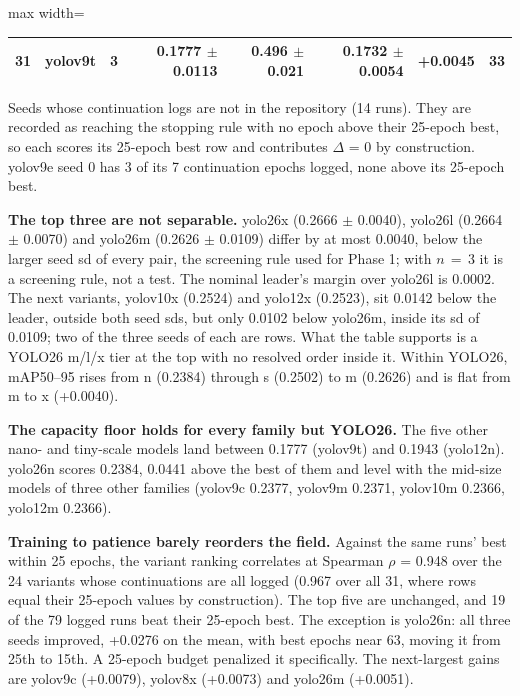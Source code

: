 \documentclass[10pt]{article}
\begin{document}
\begin{table}[htbp]
\begin{adjustbox}{max width=\linewidth}
\begin{tabular}{rllrrrrr}
31 & yolov9t & 3 & 0.1777 $\pm$ 0.0113 & 0.496 $\pm$ 0.021 & 0.1732 $\pm$ 0.0054 & +0.0045 & 33 \\
\bottomrule
\end{tabular}
\end{adjustbox}
\par\smallskip\raggedright\footnotesize \textdagger{} Seeds whose continuation logs are not in the repository (14 runs). They are recorded as reaching the stopping rule with no epoch above their 25-epoch best, so each scores its 25-epoch best row and contributes $\Delta$ = 0 by construction. yolov9e seed 0 has 3 of its 7 continuation epochs logged, none above its 25-epoch best.
\end{table}
\textbf{The top three are not separable.} yolo26x (0.2666 $\pm$ 0.0040), yolo26l (0.2664 $\pm$ 0.0070) and yolo26m (0.2626 $\pm$ 0.0109) differ by at most 0.0040, below the larger seed sd of every pair, the screening rule used for Phase 1; with $n\,{=}\,3$ it is a screening rule, not a test. The nominal leader's margin over yolo26l is 0.0002. The next variants, yolov10x (0.2524) and yolo12x (0.2523), sit 0.0142 below the leader, outside both seed sds, but only 0.0102 below yolo26m, inside its sd of 0.0109; two of the three seeds of each are \textdagger{} rows. What the table supports is a YOLO26 m/l/x tier at the top with no resolved order inside it. Within YOLO26, mAP50--95 rises from n (0.2384) through s (0.2502) to m (0.2626) and is flat from m to x (+0.0040).

\textbf{The capacity floor holds for every family but YOLO26.} The five other nano- and tiny-scale models land between 0.1777 (yolov9t) and 0.1943 (yolo12n). yolo26n scores 0.2384, 0.0441 above the best of them and level with the mid-size models of three other families (yolov9c 0.2377, yolov9m 0.2371, yolov10m 0.2366, yolo12m 0.2366).

\textbf{Training to patience barely reorders the field.} Against the same runs' best within 25 epochs, the variant ranking correlates at Spearman $\rho$ = 0.948 over the 24 variants whose continuations are all logged (0.967 over all 31, where \textdagger{} rows equal their 25-epoch values by construction). The top five are unchanged, and 19 of the 79 logged runs beat their 25-epoch best. The exception is yolo26n: all three seeds improved, +0.0276 on the mean, with best epochs near 63, moving it from 25th to 15th. A 25-epoch budget penalized it specifically. The next-largest gains are yolov9c (+0.0079), yolov8x (+0.0073) and yolo26m (+0.0051).
\end{document}

